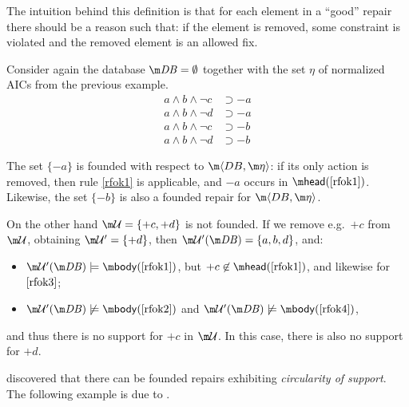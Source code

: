 The intuition behind this definition is that for each element in a ``good'' repair there should be a reason such that: if the element is removed, some constraint is violated and the removed element is an allowed fix. 


\begin{example}
  Consider again the database $\db=\emptyset$ together with the set $\eta$ of normalized AICs from the previous example.
  \begin{align}
    a\land b\land\neg c &\supset{-a} \label{rfok1} \\
    a\land b\land\neg d &\supset{-a} \label{rfok2} \\
    a\land b\land\neg c &\supset{-b} \label{rfok3} \\
    a\land b\land\neg d &\supset{-b} \label{rfok4}
  \end{align}

  The set $\{{-a}\}$ is founded with respect to $\fulldb$: if its only action is removed, then rule \ref{rfok1} is applicable, and ${-a}$ occurs in $\head(\ref{rfok1})$.
  Likewise, the set $\{{-b}\}$ is also a founded repair for $\fulldb$.

  On the other hand $\UU=\{{+c},{+d}\}$ is not founded.
  If we remove e.g.~${+c}$ from $\UU$, obtaining $\UU'=\{+d\}$, then $\UU'(\db)=\{a,b,d\}$, and:
  \begin{itemize}
  \item $\UU'(\db)\models\body(\ref{rfok1})$, but ${+c}\not\in\head(\ref{rfok1})$, and likewise for $\ref{rfok3}$;
  \item $\UU'(\db)\not\models\body(\ref{rfok2})$ and $\UU'(\db)\not\models\body(\ref{rfok4})$,
  \end{itemize}
  and thus there is no support for ${+c}$ in $\UU$.
  In this case, there is also no support for ${+d}$.
\end{example}

\citet{tplp/CaropreseT11} discovered that there can be founded repairs exhibiting \emph{circularity of support}.
The following example is due to \citet{tase/Cruz-FilipeEGN13}.

